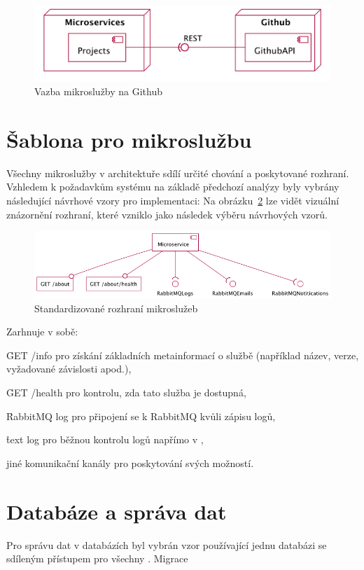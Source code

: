 \begin{figure}[htbp]
   \centering
   \includegraphics[max width=\textwidth]{assets/draft-be-github}
   \caption{Vazba mikroslužby na Github}\label{fig:server-github}
\end{figure}



\section{Šablona pro mikroslužbu}\label{sec:server-template}

Všechny mikroslužby v architektuře sdílí určité chování a poskytované rozhraní.
Vzhledem k požadavkům systému na základě předchozí analýzy byly vybrány následující návrhové vzory pro implementaci:
Na obrázku~\ref{fig:ms-template} lze vidět vizuální znázornění rozhraní, které vzniklo jako následek výběru návrhových vzorů.


\begin{figure}[htbp]
   \centering
   \includegraphics[max width=\textwidth]{assets/draft-ms-template}
   \caption{Standardizované rozhraní mikroslužeb}\label{fig:ms-template}
\end{figure}

Zarhnuje v sobě:

\begin{ul}
   \item \h{GET  /info} pro získání základních metainformací o službě (například název, verze, vyžadované závislosti apod.),
   \item \h{GET  /health} pro kontrolu, zda tato služba je dostupná,
   \item \h{RabbitMQ log} pro připojení se k RabbitMQ kvůli zápisu logů,
   \item \h{text log} pro běžnou kontrolu logů napřímo v ,
   \item jiné komunikační kanály pro poskytování svých možností.
\end{ul}



\section{Databáze a správa dat}\label{sec:server-db}

Pro správu dat v databázích byl vybrán vzor používající jednu databázi se sdíleným přístupem pro všechny .
Migrace


